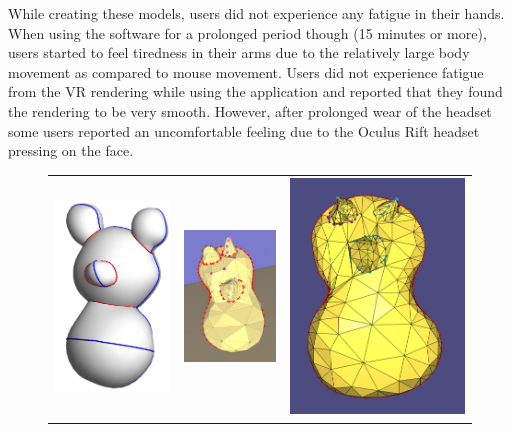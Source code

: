 While creating these models, users did not experience any fatigue in their hands. When using the software for a prolonged period though (15 minutes or more), users started to feel tiredness in their arms due to the relatively large body movement as compared to mouse movement. Users did not experience fatigue from the VR rendering while using the application and reported that they found the rendering to be very smooth. However, after prolonged wear of the headset some users reported an uncomfortable feeling due to the Oculus Rift headset pressing on the face. 


\begin{figure}[!h]
    \centering
    \setlength{\tabcolsep}{0.0130\linewidth}
    \begin{tabular}{@{}ccc@{}}
    \includegraphics[width=0.3\linewidth]{figures/example_model_figure}&
  	\includegraphics[width=0.3\linewidth]{figures/results_teddy_model1}&
  	\includegraphics[width=0.3\linewidth]{figures/results_teddy_model_nonVR}\\


\end{tabular}
\end{figure}
